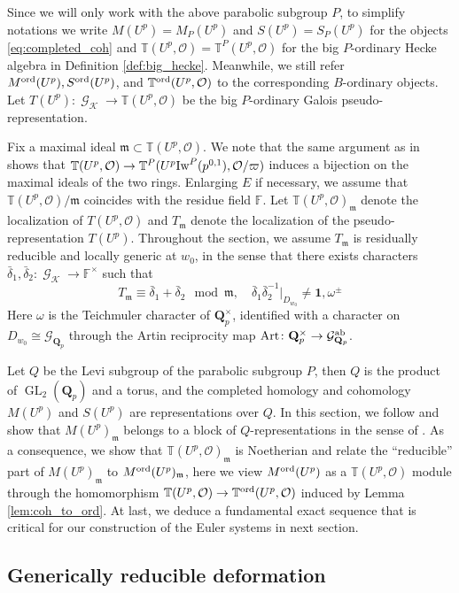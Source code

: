 \documentclass[leqno]{amsart}
\theoremstyle{definition}
\theoremstyle{remark}
\newcommand{\id}{\mathbf{1}}
\newcommand{\oo}{\mathcal{O}}
\newcommand{\fF}{\mathbb{F}} %
\newcommand{\Qp}{\mathbf{Q}_p}
\DeclareMathOperator{\GL}{GL}
\DeclareMathOperator{\Gal}{\mathcal{G}}
\DeclareMathOperator{\Art}{Art}
\newcommand{\fm}{\mathfrak{m}}
\newcommand{\Gp}{\mathcal{G}_{\Qp}} %
\newcommand{\K}{{\mathcal{K}}} %
\newcommand{\Iw}{\textnormal{Iw}} %
\newcommand{\TT}{\mathbb{T}} %
\newcommand{\ord}{\textnormal{ord}} %
\begin{document}
Since we will only work with the above parabolic subgroup $P$,
to simplify notations we write
$M(U^p)=M_P(U^p)$ and 
$S(U^p)=S_P(U^p)$
for the objects \eqref{eq:completed_coh}
and $\TT(U^p,\oo)=\TT^P(U^p,\oo)$ for the big 
$P$-ordinary Hecke algebra in Definition \ref{def:big_hecke}.
Meanwhile, we still refer
$M^{\ord}(U^p), S^{\ord}(U^p)$, and $\TT^{\ord}(U^p,\oo)$
to the corresponding $B$-ordinary objects.
Let $T(U^p)\colon \Gal_\K\to \TT(U^p,\oo)$
be the big $P$-ordinary Galois pseudo-representation.


Fix a maximal ideal $\fm\subset \TT(U^p,\oo)$.
We note that the same argument
as in \cite[Prop 3.3.6]{pan} shows that
$\TT(U^p,\oo)\to \TT^P(U^p\Iw^P(p^{0,1}),\oo/\varpi)$ 
induces a bijection on the maximal ideals of the two rings.
Enlarging $E$ if necessary, we assume that
$\TT(U^p,\oo)/\fm$ coincides with the residue field $\fF$.
Let $\TT(U^p,\oo)_{\fm}$ denote the localization
of $T(U^p,\oo)$ and $T_{\fm}$ denote 
the localization of the pseudo-representation $T(U^p)$.
Throughout the section, we assume $T_{\fm}$ is 
residually reducible and locally generic at $w_0$,
in the sense that there exists characters
$\bar{\delta}_1, \bar{\delta}_2\colon \Gal_{\K}\to \fF^\times$
such that 
\begin{equation}\tag{red.gen}\label{cond:red_gen}
	T_\fm\equiv \bar{\delta}_1+\bar{\delta}_2
	\mod \fm,\quad
	\bar{\delta}_1\bar{\delta}_2^{-1} \vert_{D_{w_0}}
	\neq \id,\omega^{\pm}
\end{equation}
Here $\omega$ is the Teichmuler character of $\Qp^\times$,
identified with a character on $D_{w_0}\cong \Gp$
through the Artin reciprocity map 
$\Art\colon \Qp^\times\to \Gp^{\textnormal{ab}}$.

Let $Q$ be the Levi subgroup of the parabolic subgroup $P$,
then $Q$ is the product of  $\GL_2(\Qp)$ and a torus,
and the completed homology and cohomology
$M(U^p)$ and $S(U^p)$
are representations over $Q$.
In this section,
we follow \cite{urban}
and show that $M(U^p)_{\fm}$ belongs to a block
of $Q$-representations in the sense of \cite{pask}.
As a consequence,
we show that $\TT(U^p,\oo)_{\fm}$ is Noetherian
and relate the ``reducible'' part of 
$M(U^p)_{\fm}$ to $M^{\ord}(U^p)_{\fm}$,
here we view $M^{\ord}(U^p)$ as a $\TT(U^p,\oo)$ module
through the homomorphism
$\TT(U^p,\oo)\to \TT^{\ord}(U^p,\oo)$ 
induced by Lemma \ref{lem:coh_to_ord}.
At last,
we deduce a fundamental exact sequence that is critical
for our construction of the Euler systems in next section.

\subsection{Generically reducible deformation}
\end{document}
